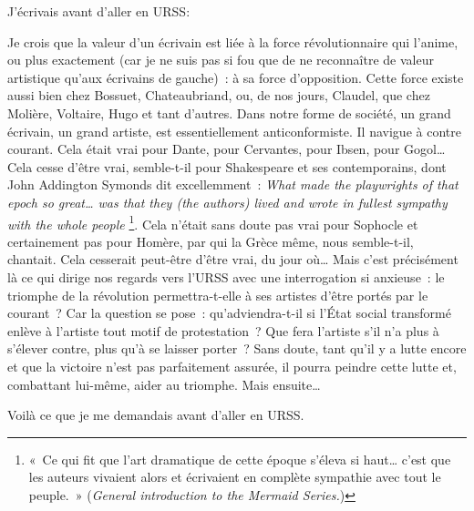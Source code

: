 \documentclass[french,twoside]{book} %
\newcommand{\astermono}{\medskip\centerline{\color{rubric}\large\selectfont{\syms ✻}}\medskip\par}%
\newcommand\chaptercont{} %
\begin{document}
\chaptercont
J’écrivais avant d’aller en URSS:\par
Je crois que la valeur d’un écrivain est liée à la force révolutionnaire qui l’anime, ou plus exactement (car je ne suis pas si fou que de ne reconnaître de valeur artistique qu’aux écrivains de gauche) : à sa force d’opposition. Cette force existe aussi bien chez Bossuet, Chateaubriand, ou, de nos jours, Claudel, que chez Molière, Voltaire, Hugo et tant d’autres. Dans notre forme de société, un grand écrivain, un grand artiste, est essentiellement anticonformiste. Il navigue à contre courant. Cela était vrai pour Dante, pour Cervantes, pour Ibsen, pour Gogol… Cela cesse d’être vrai, semble-t-il pour Shakespeare et ses contemporains, dont John Addington Symonds dit excellemment : \emph{What made the playwrights of that epoch so great… was that they (the authors) lived and wrote in fullest sympathy with the whole people} \footnote{« Ce qui fit que l’art dramatique de cette époque s’éleva si haut… c’est que les auteurs vivaient alors et écrivaient en complète sympathie avec tout le peuple. » (\emph{General introduction to the Mermaid Series.})}. Cela n’était sans doute pas vrai pour Sophocle et certainement pas pour Homère, par qui la Grèce même, nous semble-t-il, chantait. Cela cesserait peut-être d’être vrai, du jour où… Mais c’est précisément là ce qui dirige nos regards vers l’URSS avec une interrogation si anxieuse : le triomphe de la révolution permettra-t-elle à ses artistes d’être portés par le courant ? Car la question se pose : qu’adviendra-t-il si l’État social transformé enlève à l’artiste tout motif de protestation ? Que fera l’artiste s’il n’a plus à s’élever contre, plus qu’à se laisser porter ? Sans doute, tant qu’il y a lutte encore et que la victoire n’est pas parfaitement assurée, il pourra peindre cette lutte et, combattant lui-même, aider au triomphe. Mais ensuite…\par
Voilà ce que je me demandais avant d’aller en URSS.\par

\astermono
\end{document}
